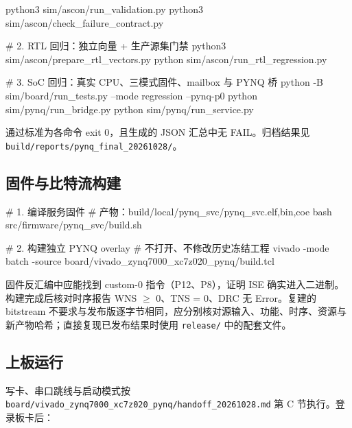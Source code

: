 \begin{codeblock}[samepage=true]

python3 sim/ascon/run_validation.py
python3 sim/ascon/check_failure_contract.py

# 2. RTL 回归：独立向量 + 生产源集门禁
python3 sim/ascon/prepare_rtl_vectors.py
python sim/ascon/run_rtl_regression.py

# 3. SoC 回归：真实 CPU、三模式固件、mailbox 与 PYNQ 桥
python -B sim/board/run_tests.py --mode regression --pynq-p0
python sim/pynq/run_bridge.py
python sim/pynq/run_service.py
\end{codeblock}

通过标准为各命令 exit 0，且生成的 JSON 汇总中无 FAIL。归档结果见 \texttt{build/\allowbreak{}reports/\allowbreak{}pynq\_\allowbreak{}final\_\allowbreak{}20261028/\allowbreak{}}。

\Needspace{128pt}

\subsection{固件与比特流构建}

\begin{codeblock}[samepage=true]
# 1. 编译服务固件
#    产物：build/local/pynq_svc/pynq_svc.{elf,bin,coe}
bash src/firmware/pynq_svc/build.sh

# 2. 构建独立 PYNQ overlay
#    不打开、不修改历史冻结工程
vivado -mode batch -source board/vivado_zynq7000_xc7z020_pynq/build.tcl
\end{codeblock}

固件反汇编中应能找到 custom-0 指令（P12、P8），证明 ISE 确实进入二进制。构建完成后核对时序报告 WNS $\geq$ 0、TNS = 0、DRC 无 Error。复建的 bitstream 不要求与发布版逐字节相同，应分别核对源输入、功能、时序、资源与新产物哈希；直接复现已发布结果时使用 \texttt{release/\allowbreak{}} 中的配套文件。

\Needspace{206pt}

\subsection{上板运行}

写卡、串口跳线与启动模式按 \texttt{board/\allowbreak{}vivado\_\allowbreak{}zynq7000\_\allowbreak{}xc7z020\_\allowbreak{}pynq/\allowbreak{}handoff\_\allowbreak{}20261028.\allowbreak{}md} 第 C 节执行。登录板卡后：



